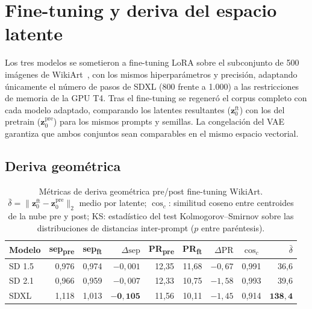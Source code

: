 \documentclass[12pt, a4paper, twoside]{book}
\newcommand{\z}{\mathbf{z}}
\begin{document}
\section{Fine-tuning y deriva del espacio latente}
\label{sec:res:finetune}

Los tres modelos se sometieron a fine-tuning LoRA sobre el subconjunto de 500 imágenes de
WikiArt~\citep{saleh2015wikiart}, con los mismos hiperparámetros y precisión, adaptando
únicamente el número de pasos de SDXL (800 frente a 1.000) a las restricciones de
memoria de la GPU T4.
Tras el fine-tuning se regeneró el corpus completo con cada modelo adaptado,
comparando los latentes resultantes ($\z_0^{\text{ft}}$) con los del pretrain ($\z_0^{\text{pre}}$)
para los mismos prompts y semillas. La congelación del VAE garantiza que ambos conjuntos sean
comparables en el mismo espacio vectorial.

\subsection{Deriva geométrica}
\label{subsec:res:deriva_geometrica}

\begin{table}[htb]
\centering
\caption{Métricas de deriva geométrica pre/post fine-tuning WikiArt. $\bar{\delta} =
\|\z_0^\text{ft} - \z_0^\text{pre}\|_2$ medio por latente; $\cos_c$: similitud coseno entre
centroides de la nube pre y post; KS: estadístico del test Kolmogorov--Smirnov sobre las
distribuciones de distancias inter-prompt ($p$ entre paréntesis).}
\label{tab:deriva_geometrica}
\small
\begin{tabular}{lrrrrrrrr}
\toprule
\textbf{Modelo} & \textbf{sep\textsubscript{pre}} & \textbf{sep\textsubscript{ft}} &
$\Delta\text{sep}$ & \textbf{PR\textsubscript{pre}} & \textbf{PR\textsubscript{ft}} &
$\Delta\text{PR}$ & $\cos_c$ & $\bar{\delta}$ \\
\midrule
SD 1.5 & 0,976 & 0,974 & $-0{,}001$ & 12,35 & 11,68 & $-0{,}67$ & 0,991 & \phantom{00}36,6 \\
SD 2.1 & 0,966 & 0,959 & $-0{,}007$ & 12,33 & 10,75 & $-1{,}58$ & 0,993 & \phantom{00}39,6 \\
SDXL   & 1,118 & 1,013 & $\mathbf{-0{,}105}$ & 11,56 & 10,11 & $-1{,}45$ & 0,914 &
$\mathbf{138,4}$ \\
\bottomrule
\end{tabular}
\end{table}
\end{document}
